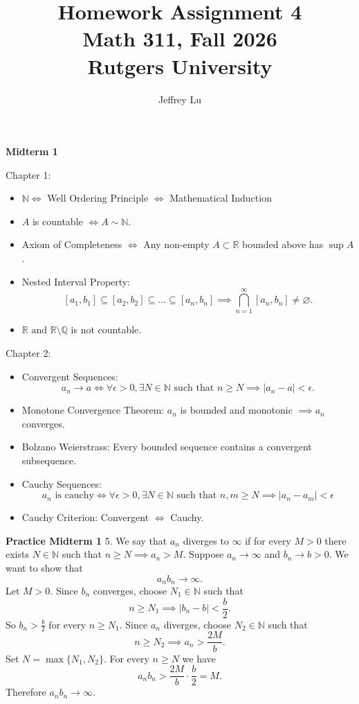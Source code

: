 \documentclass[12pt]{article}
\title{Homework Assignment 4 \\ \large Math 311, Fall 2026 \\ Rutgers University}
\date{}
\author{Jeffrey Lu}
\begin{document}
\maketitle

\textbf{Midterm 1}

Chapter 1:
\begin{itemize}
    \item \( \mathbb{N} \iff \) Well Ordering Principle \( \iff \) Mathematical Induction
    \item  \( A \) is countable \( \iff A \sim \mathbb{N} \).
    \item Axiom of Completeness \( \iff \) Any non-empty \( A \subset \mathbb{R} \) bounded above has \( \sup A \).
    \item Nested Interval Property:
          \[
              [a_1, b_1] \subseteq [a_2, b_2] \subseteq \dots \subseteq [a_n, b_n] \implies \bigcap_{n=1}^{\infty} [a_n, b_n] \neq \varnothing .
          \]
    \item \( \mathbb{R} \text{ and } \mathbb{R} \setminus \mathbb{Q} \) is not countable.

\end{itemize}
Chapter 2:
\begin{itemize}
    \item Convergent Sequences:
          \[
              a_n \to a \iff \forall \epsilon > 0, \exists N \in \mathbb{N} \text{ such that } n \geq N \implies |a_n - a| < \epsilon.
          \]

    \item Monotone Convergence Theorem: \( a_n \) is bounded and monotonic \( \implies a_n \) converges.
    \item Bolzano Weierstrass: Every bounded sequence contains a convergent subsequence.
    \item Cauchy Sequences:
          \[
              a_n \text{ is cauchy} \iff \forall \epsilon > 0, \exists N \in \mathbb{N} \text{ such that } n,m \geq N \implies |a_n - a_m| < \epsilon
          \]
    \item Cauchy Criterion: Convergent \( \iff \) Cauchy.

\end{itemize}

\textbf{Practice Midterm 1}
5.
We say that \( a_n \) diverges to \( \infty \) if for every \( M > 0 \)
there exists \( N \in \mathbb{N} \) such that \( n \geq N \implies a_n > M \).
Suppose \( a_n \to \infty  \) and \( b_n \to b > 0 \).
We want to show that
\[
    a_n b_n \to \infty .
\]
Let \( M > 0 \). Since \( b_n \) converges, choose \( N_1 \in \mathbb{N} \) such that
\[
    n \geq N_1 \implies \vert b_n - b \vert  < \frac{b}{2}.
\]
So \( b_n > \frac{b}{2} \) for every \( n \geq N_1 \).
Since \( a_n \) diverges, choose \( N_2 \in \mathbb{N} \) such that
\[
    n \geq N_2 \implies a_n > \frac{2M}{b}.
\]
Set \( N = \max \{N_1, N_2\} \). For every \( n \geq N \) we have
\[
    a_{n} b_n > \frac{2M}{b} \cdot \frac{b}{2} = M.
\]
Therefore \( a_n b_n \to \infty  \).
\end{document}
